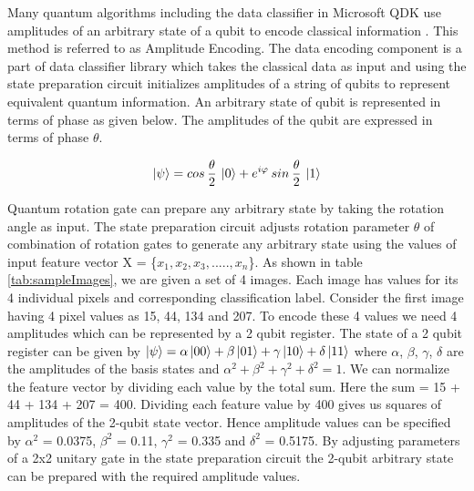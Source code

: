 \documentclass[english,a4paper,11pt,oneside,onecolumn]{book}
\begin{document}
Many quantum algorithms including the data classifier in Microsoft QDK use amplitudes of an arbitrary state of a qubit to encode classical information \cite{schuld_2020_circuitcentric}. This method is referred to as Amplitude Encoding. The data encoding component is a part of data classifier library which takes the classical data as input and using the state preparation circuit initializes amplitudes of a string of qubits to represent equivalent quantum information. An arbitrary state of qubit is represented in terms of phase as given below. The amplitudes of the qubit are expressed in terms of phase $\theta$.

\begin{equation}\label{eq:13}
    \ket{\psi} = cos\hspace{2pt}\dfrac{\theta}{2}\hspace{2pt}\ket{0} + e^{i\varphi} \hspace{2pt}sin\hspace{2pt}\dfrac{\theta}{2}\hspace{2pt}\ket{1}
\end{equation}

Quantum rotation gate can prepare any arbitrary state by taking the rotation angle as input. The state preparation circuit adjusts rotation parameter $\theta$ of combination of rotation gates to generate any arbitrary state using the values of input feature vector X = \{$x_1, x_2, x_3, ....., x_n$\}. As shown in table  \ref{tab:sampleImages}, we are given a set of 4 images. Each image has values for its 4 individual pixels and corresponding classification label. Consider the first image having 4 pixel values as 15, 44, 134 and 207. To encode these 4 values we need 4 amplitudes which can be represented by a 2 qubit register. The state of a 2 qubit register can be given by \(\ket{\psi}=\alpha\ket{00} + \beta\ket{01} + \gamma\ket{10} + \delta\ket{11}\) where \(\alpha\), \(\beta\), \(\gamma\), \(\delta\) are the amplitudes of the basis states and \(\alpha^2 + \beta^2 + \gamma^2 + \delta^2 = 1\). We can normalize the feature vector by dividing each value by the total sum. Here the sum = 15 + 44 + 134 + 207 = 400. Dividing each feature value by 400 gives us squares of amplitudes of the 2-qubit state vector. Hence amplitude values can be specified by \(\alpha^2\) = 0.0375, \(\beta^2\) = 0.11, \(\gamma^2\) = 0.335 and \(\delta^2\) = 0.5175. By adjusting parameters of a 2x2 unitary gate in the state preparation circuit the 2-qubit arbitrary state can be prepared with the required amplitude values.
\end{document}
